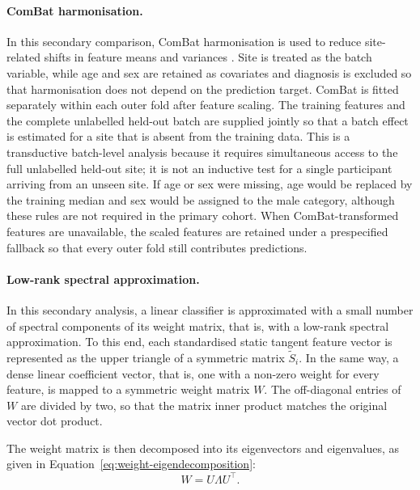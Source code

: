 \paragraph{\textbf{ComBat harmonisation.}}
\label{par:combat-harmonisation}

In this secondary comparison, ComBat harmonisation is used to reduce site-related shifts in feature means and variances \citep{Johnsonetal2007,Fortinetal2018}. Site is treated as the batch variable, while age and sex are retained as covariates and diagnosis is excluded so that harmonisation does not depend on the prediction target. ComBat is fitted separately within each outer fold after feature scaling. The training features and the complete unlabelled held-out batch are supplied jointly so that a batch effect is estimated for a site that is absent from the training data. This is a transductive batch-level analysis because it requires simultaneous access to the full unlabelled held-out site; it is not an inductive test for a single participant arriving from an unseen site. If age or sex were missing, age would be replaced by the training median and sex would be assigned to the male category, although these rules are not required in the primary cohort. When ComBat-transformed features are unavailable, the scaled features are retained under a prespecified fallback so that every outer fold still contributes predictions.


\paragraph{\textbf{Low-rank spectral approximation.}}
\label{par:low-rank-spectral}
In this secondary analysis, a linear classifier is approximated with a small number of
spectral components of its weight matrix, that is, with a low-rank spectral approximation.
To this end, each standardised static tangent feature vector is represented as the upper
triangle of a symmetric matrix $\widetilde{S}_i$. In the same way, a dense linear
coefficient vector, that is, one with a non-zero weight for every feature, is mapped to a
symmetric weight matrix $W$. The off-diagonal entries of $W$ are divided by two, so that
the matrix inner product matches the original vector dot product.

The weight matrix is then decomposed into its eigenvectors and eigenvalues, as given in
Equation~\eqref{eq:weight-eigendecomposition}:
\begin{equation}
W
=
U\Lambda U^\top.
\label{eq:weight-eigendecomposition}
\end{equation}

